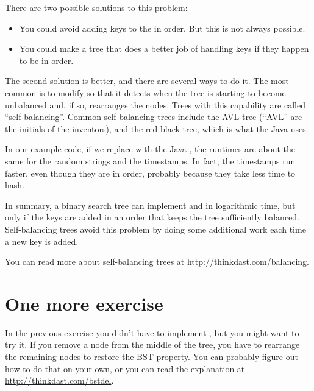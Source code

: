 \documentclass[12pt]{book}
\theoremstyle{exercise}
\begin{document}

There are two possible solutions to this problem:

\begin{itemize}

\item
  You could avoid adding keys to the  in order. But this is
  not always possible.

\item
  You could make a tree that does a better job of handling keys if they
  happen to be in order.

\end{itemize}

The second solution is better, and there are several ways to do it. The
most common is to modify  so that it detects when the tree
is starting to become unbalanced and, if so, rearranges the nodes. Trees
with this capability are called ``self-balancing''. Common
self-balancing trees include the AVL tree (``AVL'' are the initials of
the inventors), and the red-black tree, which is what the Java
 uses.


In our example code, if we replace  with the Java
, the runtimes are about the same for the random strings
and the timestamps. In fact, the timestamps run faster, even though they
are in order, probably because they take less time to hash.


In summary, a binary search tree can implement  and
 in logarithmic time, but only if the keys are added in an
order that keeps the tree sufficiently balanced. Self-balancing trees
avoid this problem by doing some additional work each time a new key is
added.

You can read more about self-balancing trees at
\url{http://thinkdast.com/balancing}.


\section{One more exercise}
\label{one-more-exercise}

In the previous exercise you didn't have to implement ,
but you might want to try it. If you remove a node from the middle of
the tree, you have to rearrange the remaining nodes to restore the BST
property.  You can probably figure out how to do that on your own, or
you can read the explanation at
\url{http://thinkdast.com/bstdel}.
\end{document}
